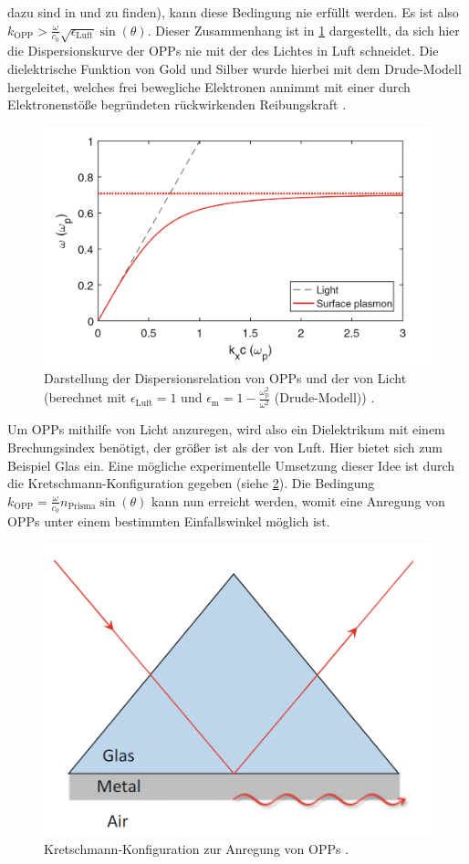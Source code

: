 dazu sind in \cite{linden_photonics} und \cite{nano} zu finden), kann diese Bedingung nie erfüllt werden. Es ist also $k_{\mathrm{OPP}} > \frac{\omega}{c_0}\sqrt{\epsilon_{\mathrm{Luft}}}\sin(\theta)$.
Dieser Zusammenhang ist in \cref{fig:dispersion} dargestellt, da sich hier die Dispersionskurve der OPPs nie mit der des Lichtes in Luft schneidet. Die dielektrische Funktion 
von Gold und Silber wurde hierbei mit dem Drude-Modell hergeleitet, welches frei bewegliche Elektronen annimmt mit einer durch 
Elektronenstöße begründeten rückwirkenden Reibungskraft \cite{linden_optik}.
\begin{figure}[H]
	\centering
	\includegraphics[width=0.6\linewidth]{../figs/dispersion.png}
	\caption{Darstellung der Dispersionsrelation von OPPs und der von Licht (berechnet mit $\epsilon_{\mathrm{Luft}} = 1$ und $\epsilon_{\mathrm{m}} = 1 - \frac{\omega_{\mathrm{p}}^2}{\omega^2}$ (Drude-Modell)) \cite{nano}.}
	\label{fig:dispersion}
\end{figure} Um OPPs mithilfe von Licht anzuregen, wird also ein Dielektrikum mit einem Brechungsindex benötigt, der größer ist als der von Luft. Hier bietet sich zum Beispiel Glas ein.
Eine mögliche experimentelle Umsetzung dieser Idee ist durch die Kretschmann-Konfiguration gegeben (siehe \cref{fig:kretschmann}). Die Bedingung $k_{\mathrm{OPP}} = \frac{\omega}{c_0}n_{\mathrm{Prisma}}\sin(\theta)$
kann nun erreicht werden, womit eine Anregung von OPPs unter einem bestimmten Einfallswinkel möglich ist.
\begin{figure}[H]
	\centering
	\includegraphics[width=0.4\linewidth]{../figs/kretschmann.png}
	\caption{Kretschmann-Konfiguration zur Anregung von OPPs \cite{nano}.}
	\label{fig:kretschmann}
\end{figure}